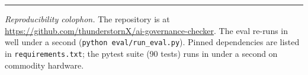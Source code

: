\documentclass[conference]{IEEEtran}
\begin{document}
\vspace{2mm}
\noindent\rule{\linewidth}{0.4pt}

\noindent\textit{Reproducibility colophon.} The repository is at
\url{https://github.com/thunderstornX/ai-governance-checker}. The
eval re-runs in well under a second
(\texttt{python eval/run\_eval.py}). Pinned dependencies are listed
in \texttt{requirements.txt}; the pytest suite (90 tests) runs in
under a second on commodity hardware.
\end{document}
